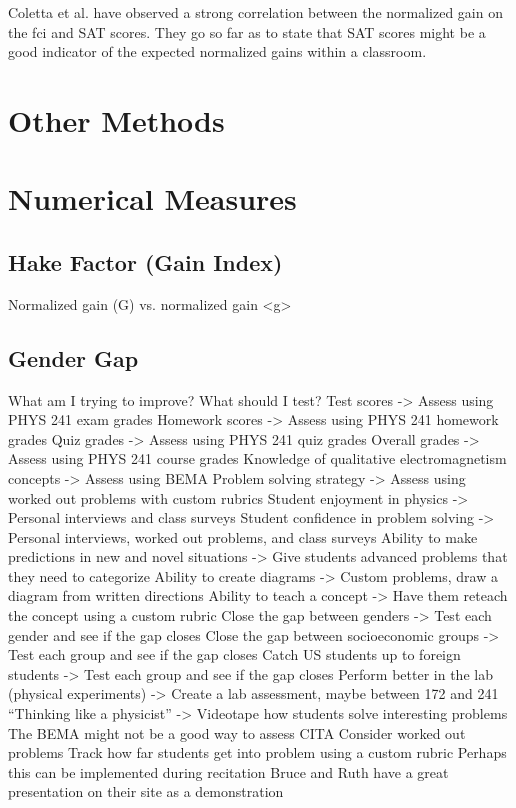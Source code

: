 Coletta et al. have observed a strong correlation between the normalized gain on the \gls{fci} and SAT scores. They go so far as to state that SAT scores might be a good indicator of the expected normalized gains within a classroom\cite{coletta2007}.

\section{Other Methods}

\section{Numerical Measures}

\subsection{Hake Factor (Gain Index)}

Normalized gain (G) vs. normalized gain <g>

\subsection{Gender Gap}

What am I trying to improve? What should I test?
Test scores -> Assess using PHYS 241 exam grades
Homework scores -> Assess using PHYS 241 homework grades
Quiz grades -> Assess using PHYS 241 quiz grades
Overall grades -> Assess using PHYS 241 course grades
Knowledge of qualitative electromagnetism concepts -> Assess using BEMA
Problem solving strategy -> Assess using worked out problems with custom rubrics
Student enjoyment in physics -> Personal interviews and class surveys
Student confidence in problem solving -> Personal interviews, worked out problems, and class surveys
Ability to make predictions in new and novel situations -> Give students advanced problems that they need to categorize
Ability to create diagrams -> Custom problems, draw a diagram from written directions
Ability to teach a concept -> Have them reteach the concept using a custom rubric
Close the gap between genders -> Test each gender and see if the gap closes
Close the gap between socioeconomic groups -> Test each group and see if the gap closes
Catch US students up to foreign students -> Test each group and see if the gap closes
Perform better in the lab (physical experiments) -> Create a lab assessment, maybe between 172 and 241
“Thinking like a physicist” -> Videotape how students solve interesting problems
The BEMA might not be a good way to assess CITA
Consider worked out problems
Track how far students get into problem using a custom rubric
Perhaps this can be implemented during recitation
Bruce and Ruth have a great presentation on their site as a demonstration

